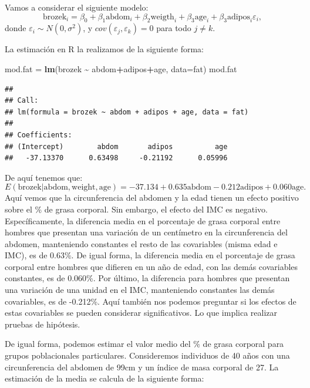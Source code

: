 \documentclass[
]{article}
\newenvironment{Shaded}{\begin{snugshade}}{\end{snugshade}}
\newcommand{\AttributeTok}[1]{\textcolor[rgb]{0.13,0.29,0.53}{#1}}
\newcommand{\FunctionTok}[1]{\textcolor[rgb]{0.13,0.29,0.53}{\textbf{#1}}}
\newcommand{\NormalTok}[1]{#1}
\newcommand{\OtherTok}[1]{\textcolor[rgb]{0.56,0.35,0.01}{#1}}
\newcommand{\SpecialCharTok}[1]{\textcolor[rgb]{0.81,0.36,0.00}{\textbf{#1}}}
\begin{document}
Vamos a considerar el siguiente modelo:
\[
\mbox{brozek}_{i} = \beta_{0} + \beta_{1}\mbox{abdom}_{i} + \beta_{2}\mbox{weigth}_{i}+\beta_{3}\mbox{age}_{i} + \beta_{3}\mbox{adipos}_{i} \varepsilon_{i},
\]
donde \(\varepsilon_{i}\sim N(0,\sigma^{2})\), y \(cov(\varepsilon_{j},\varepsilon_{k})=0\) para todo \(j\neq k\).

La estimación en R la realizamos de la siguiente forma:

\begin{Shaded}
\begin{Highlighting}[]
\NormalTok{mod.fat }\OtherTok{=} \FunctionTok{lm}\NormalTok{(brozek }\SpecialCharTok{\textasciitilde{}}\NormalTok{ abdom}\SpecialCharTok{+}\NormalTok{adipos}\SpecialCharTok{+}\NormalTok{age, }\AttributeTok{data=}\NormalTok{fat)}
\NormalTok{mod.fat}
\end{Highlighting}
\end{Shaded}

\begin{verbatim}
## 
## Call:
## lm(formula = brozek ~ abdom + adipos + age, data = fat)
## 
## Coefficients:
## (Intercept)        abdom       adipos          age  
##   -37.13370      0.63498     -0.21192      0.05996
\end{verbatim}

De aquí tenemos que:
\[
E(\mbox{brozek} | \mbox{abdom}, \mbox{weight},\mbox{age})= -37.134+0.635\mbox{abdom}-0.212\mbox{adipos} + 0.060\mbox{age}.
\]
Aquí vemos que la circunferencia del abdomen y la edad tienen un efecto positivo sobre el \% de grasa corporal. Sin embargo, el efecto del IMC es negativo. Específicamente, la diferencia media en el porcentaje de grasa corporal entre hombres que presentan una variación de un centímetro en la circunferencia del abdomen, manteniendo constantes el resto de las covariables (misma edad e IMC), es de 0.63\%. De igual forma, la diferencia media en el porcentaje de grasa corporal entre hombres que difieren en un año de edad, con las demás covariables constantes, es de 0.060\%. Por último, la diferencia para hombres que presentan una variación de una unidad en el IMC, manteniendo constantes las demás covariables, es de -0.212\%. Aquí también nos podemos preguntar si los efectos de estas covariables se pueden considerar significativos. Lo que implica realizar pruebas de hipótesis.

De igual forma, podemos estimar el valor medio del \% de grasa corporal para grupos poblacionales particulares. Consideremos individuos de 40 años con una circunferencia del abdomen de 99cm y un índice de masa corporal de 27. La estimación de la media se calcula de la siguiente forma:
\end{document}
